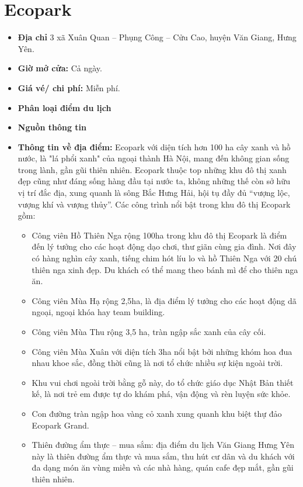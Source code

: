 \documentclass{article}
\begin{document}
\section{Ecopark}
\begin{itemize}
    \item{\textbf{Địa chỉ}} 3 xã Xuân Quan – Phụng Công – Cửu Cao, huyện Văn Giang, Hưng Yên.

    \item{\textbf{Giờ mở cửa:}} Cả ngày.

    \item{\textbf{Giá vé/ chi phí:}} Miễn phí.

    \item{\textbf{Phân loại điểm du lịch}} 

    \item{\textbf{Nguồn thông tin}} 

    \item{\textbf{Thông tin về địa điểm:}} Ecopark với diện tích hơn 100 ha cây xanh và hồ nước, là "lá phổi xanh" của ngoại thành Hà Nội, mang đến không gian sống trong lành, gần gũi thiên nhiên. Ecopark thuộc top những khu đô thị xanh đẹp cũng như đáng sống hàng đầu tại nước ta, không những thế còn sở hữu vị trí đắc địa, xung quanh là sông Bắc Hưng Hải, hội tụ đầy đủ “vượng lộc, vượng khí và vượng thủy”.
    Các công trình nổi bật trong khu đô thị Ecopark gồm:
    \begin{itemize}
        \item{Công viên Hồ Thiên Nga rộng 100ha trong khu đô thị Ecopark là điểm đến lý tưởng cho các hoạt động dạo chơi, thư giãn cùng gia đình. Nơi đây có hàng nghìn cây xanh, tiếng chim hót líu lo và hồ Thiên Nga với 20 chú thiên nga xinh đẹp. Du khách có thể mang theo bánh mì để cho thiên nga ăn.}
        \item{Công viên Mùa Hạ rộng 2,5ha, là địa điểm lý tưởng cho các hoạt động dã ngoại, ngoại khóa hay team building.}
        \item{Công viên Mùa Thu rộng 3,5 ha, tràn ngập sắc xanh của cây cối.}
        \item{Công viên Mùa Xuân với diện tích 3ha nổi bật bởi những khóm hoa đua nhau khoe sắc, đồng thời cũng là nơi tổ chức nhiều sự kiện ngoài trời.}
        \item{Khu vui chơi ngoài trời bằng gỗ này, do tổ chức giáo dục Nhật Bản thiết kế, là nơi trẻ em được tự do khám phá, vận động và rèn luyện sức khỏe.}
        \item{Con đường tràn ngập hoa vàng cỏ xanh xung quanh khu biệt thự đảo Ecopark Grand.}
        \item{Thiên đường ẩm thực – mua sắm: địa điểm du lịch Văn Giang Hưng Yên này là thiên đường ẩm thực và mua sắm, thu hút cư dân và du khách với đa dạng món ăn vùng miền và các nhà hàng, quán cafe đẹp mắt, gần gũi thiên nhiên.}
    \end{itemize}
\end{itemize}
\end{document}
